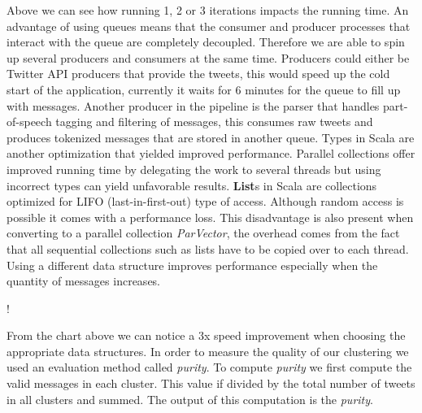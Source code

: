 Above we can see how running 1, 2 or 3 iterations impacts the running time.
\newline
An advantage of using queues means that the consumer and producer processes that interact with the queue are completely decoupled. Therefore we are able to spin up several producers and consumers at the same time. Producers could either be Twitter API producers that provide the tweets, this would speed up the cold start of the application, currently it waits for 6 minutes for the queue to fill up with messages. Another producer in the pipeline is the parser that handles part-of-speech tagging and filtering of messages, this consumes raw tweets and produces tokenized messages that are stored in another queue.
\newline
Types in Scala are another optimization that yielded improved performance. Parallel collections offer improved running time by delegating the work to several threads but using incorrect types can yield unfavorable results. \textbf{List}s in Scala are collections optimized for LIFO (last-in-first-out) type of access. Although random access is possible it comes with a performance loss. This disadvantage is also present when converting to a parallel collection \textit{ParVector}, the overhead comes from the fact that all sequential collections such as lists have to be copied over to each thread. Using a different data structure improves performance especially when the quantity of messages increases.

\resizebox {\columnwidth} {!} {
}

From the chart above we can notice a 3x speed improvement when choosing the appropriate data structures.
\newline
\newline
In order to measure the quality of our clustering we used an evaluation method called \textit{purity}. To compute \textit{purity} we first compute the valid messages in each cluster. This value if divided by the total number of tweets in all clusters and summed. The output of this computation is the \textit{purity}.

